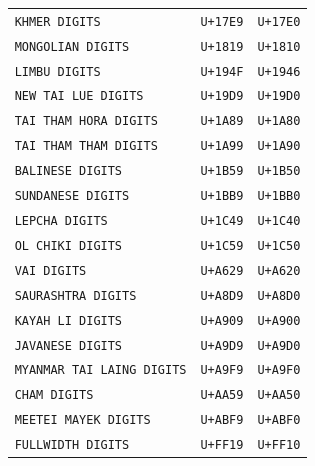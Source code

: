 \documentclass[
    alternativetitlepage=alternativ,
    cornerlogo=hgi_nds_logo2,
    sectionoverview,
]{rubpresentation}
\begin{document}
\begin{frame}
\begin{itemize}
\begin{columns}
\begin{column}{0.5\textwidth}
\begin{center}
      \end{center}
    \end{column}
    \begin{column}{0.5\textwidth}
      \begin{center}
      \begin{tabular}{lrr}
\texttt{KHMER DIGITS} & \texttt{U+17E9} &  \texttt{U+17E0}\\
\texttt{MONGOLIAN DIGITS} & \texttt{U+1819} &  \texttt{U+1810}\\
\texttt{LIMBU DIGITS} & \texttt{U+194F} &  \texttt{U+1946}\\
\texttt{NEW TAI LUE DIGITS} & \texttt{U+19D9} &  \texttt{U+19D0}\\
\texttt{TAI THAM HORA DIGITS} & \texttt{U+1A89} &  \texttt{U+1A80}\\
\texttt{TAI THAM THAM DIGITS} & \texttt{U+1A99} &  \texttt{U+1A90}\\
\texttt{BALINESE DIGITS} & \texttt{U+1B59} &  \texttt{U+1B50}\\
\texttt{SUNDANESE DIGITS} & \texttt{U+1BB9} &  \texttt{U+1BB0}\\
\texttt{LEPCHA DIGITS} & \texttt{U+1C49} &  \texttt{U+1C40}\\
\texttt{OL CHIKI DIGITS} & \texttt{U+1C59} &  \texttt{U+1C50}\\
\texttt{VAI DIGITS} & \texttt{U+A629} &  \texttt{U+A620}\\
\texttt{SAURASHTRA DIGITS} & \texttt{U+A8D9} &  \texttt{U+A8D0}\\
\texttt{KAYAH LI DIGITS} & \texttt{U+A909} &  \texttt{U+A900}\\
\texttt{JAVANESE DIGITS} & \texttt{U+A9D9} &  \texttt{U+A9D0}\\
\texttt{MYANMAR TAI LAING DIGITS} & \texttt{U+A9F9} &  \texttt{U+A9F0}\\
\texttt{CHAM DIGITS} & \texttt{U+AA59} &  \texttt{U+AA50}\\
\texttt{MEETEI MAYEK DIGITS} & \texttt{U+ABF9} &  \texttt{U+ABF0}\\
\texttt{FULLWIDTH DIGITS} & \texttt{U+FF19} &  \texttt{U+FF10}\\
    \end{tabular}
      \end{center}
    \end{column}
    \end{columns}
      \endgroup
  \end{itemize}
\end{frame}
\end{document}

